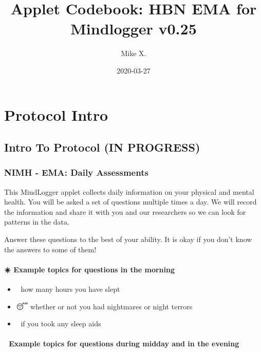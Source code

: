 \documentclass[]{book}
\title{Applet Codebook: HBN EMA for Mindlogger v0.25}
\author{Mike X.}
\date{2020-03-27}
\providecommand{\tightlist}{%
  \setlength{\itemsep}{0pt}\setlength{\parskip}{0pt}}
\begin{document}
\maketitle

{
\setcounter{tocdepth}{1}
\tableofcontents
}
\hypertarget{part-protocol-intro}{%
\part{Protocol Intro}\label{part-protocol-intro}}

\hypertarget{intro}{%
\chapter*{Intro To Protocol (IN PROGRESS)}\label{intro}}

\hypertarget{nimh---ema-daily-assessments}{%
\section{NIMH - EMA: Daily Assessments}\label{nimh---ema-daily-assessments}}

This MindLogger applet collects daily information on your physical and mental health.
You will be asked a set of questions multiple times a day. We will record the information and share it with you and our researchers so we can look for patterns in the data.

Answer these questions to the best of your ability. It is okay if you don't know the answers to some of them!

\hypertarget{example-topics-for-questions-in-the-morning}{%
\subsection{☀️ Example topics for questions in the morning}\label{example-topics-for-questions-in-the-morning}}

\begin{itemize}
\tightlist
\item
  🛌 how many hours you have slept
\item
  😴 whether or not you had nightmares or night terrors
\item
  💊 if you took any sleep aids
\end{itemize}

\hypertarget{example-topics-for-questions-during-midday-and-in-the-evening}{%
\subsection{🌙 Example topics for questions during midday and in the evening}\label{example-topics-for-questions-during-midday-and-in-the-evening}}
\end{document}
